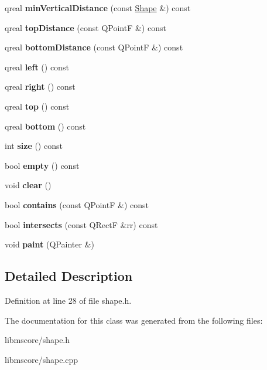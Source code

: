 \begin{DoxyCompactItemize}
qreal {\bfseries min\+Vertical\+Distance} (const \hyperlink{class_ms_1_1_shape}{Shape} \&) const
\item 
\mbox{\label{class_ms_1_1_shape_a63c6f501d701f77b9b07cf43ad71a1be}} 
qreal {\bfseries top\+Distance} (const Q\+PointF \&) const
\item 
\mbox{\label{class_ms_1_1_shape_ae213f269a5b776c7b4d831bbe6ae67f5}} 
qreal {\bfseries bottom\+Distance} (const Q\+PointF \&) const
\item 
\mbox{\label{class_ms_1_1_shape_a277958ebd3d7acd75f428ab75071568a}} 
qreal {\bfseries left} () const
\item 
\mbox{\label{class_ms_1_1_shape_a2bcfd20f6873a977e11fcd078f9d6ea3}} 
qreal {\bfseries right} () const
\item 
\mbox{\label{class_ms_1_1_shape_abfab9c37e26f80c54532642f8106c788}} 
qreal {\bfseries top} () const
\item 
\mbox{\label{class_ms_1_1_shape_ab9fdef0f0d375caf55c4f02d40e2bc92}} 
qreal {\bfseries bottom} () const
\item 
\mbox{\label{class_ms_1_1_shape_aebb6916032868310b40792859d5c4dde}} 
int {\bfseries size} () const
\item 
\mbox{\label{class_ms_1_1_shape_a575e43623b8dc7913ba31b1bbf1d78b5}} 
bool {\bfseries empty} () const
\item 
\mbox{\label{class_ms_1_1_shape_ad064c4dfda3cbc7434355a26d88f763d}} 
void {\bfseries clear} ()
\item 
\mbox{\label{class_ms_1_1_shape_a3701cd44981246acfa15ca202c641725}} 
bool {\bfseries contains} (const Q\+PointF \&) const
\item 
\mbox{\label{class_ms_1_1_shape_aae937632bf13592c1c4e9138083cdea8}} 
bool {\bfseries intersects} (const Q\+RectF \&rr) const
\item 
\mbox{\label{class_ms_1_1_shape_a7874734678f332bc1b30f2fed4b6555c}} 
void {\bfseries paint} (Q\+Painter \&)
\end{DoxyCompactItemize}


\subsection{Detailed Description}


Definition at line 28 of file shape.\+h.



The documentation for this class was generated from the following files\+:\begin{DoxyCompactItemize}
\item 
libmscore/shape.\+h\item 
libmscore/shape.\+cpp\end{DoxyCompactItemize}

